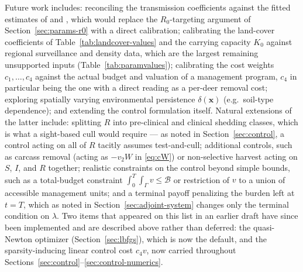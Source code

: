 \documentclass[11pt]{article}
\begin{document}
Future work includes: reconciling the transmission coefficients against the fitted estimates of \citet{Wasserberg2009} and \citet{Miller2006}, which would replace the $R_0$-targeting argument of Section~\ref{sec:params-r0} with a direct calibration; calibrating the land-cover coefficients of Table~\ref{tab:landcover-values} and the carrying capacity $K_0$ against regional surveillance and density data, which are the largest remaining unsupported inputs (Table~\ref{tab:paramvalues}); calibrating the cost weights $c_1,\dots,c_4$ against the actual budget and valuation of a management program, $c_4$ in particular being the one with a direct reading as a per-deer removal cost; exploring spatially varying environmental persistence $\delta(\mathbf{x})$ (e.g.\ soil-type dependence); and extending the control formulation itself. Natural extensions of the latter include: splitting $R$ into pre-clinical and clinical shedding classes, which is what a sight-based cull would require --- as noted in Section~\ref{sec:control}, a control acting on all of $R$ tacitly assumes test-and-cull; additional controls, such as carcass removal (acting as $-v_2 W$ in \eqref{eq:cW}) or non-selective harvest acting on $S$, $I$, and $R$ together; realistic constraints on the control beyond simple bounds, such as a total-budget constraint $\int_0^T\int_\Gamma v \le \mathcal{B}$ or restriction of $v$ to a union of accessible management units; and a terminal payoff penalizing the burden left at $t=T$, which as noted in Section~\ref{sec:adjoint-system} changes only the terminal condition on $\lambda$. Two items that appeared on this list in an earlier draft have since been implemented and are described above rather than deferred: the quasi-Newton optimizer (Section~\ref{sec:lbfgs}), which is now the default, and the sparsity-inducing linear control cost $c_4 v$, now carried throughout Sections~\ref{sec:control}--\ref{sec:control-numerics}.
\end{document}
